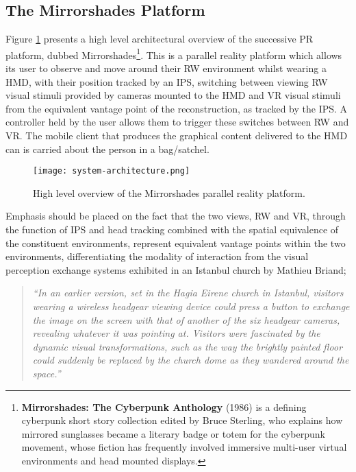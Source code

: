 \subsection{The Mirrorshades Platform}

Figure \ref{systemarchitecture} presents a high level architectural overview of the successive PR platform, dubbed Mirrorshades\footnote{\textbf{Mirrorshades: The Cyberpunk Anthology} (1986) is a defining cyberpunk short story collection edited by Bruce Sterling, who explains how mirrored sunglasses became a literary badge or totem for the cyberpunk movement, whose fiction has frequently involved immersive multi-user virtual environments and head mounted displays.}. This is a parallel reality platform which allows its user to observe and move around their RW environment whilst wearing a HMD, with their position tracked by an IPS, switching between viewing RW visual stimuli provided by cameras mounted to the HMD and VR visual stimuli from the equivalent vantage point of the reconstruction, as tracked by the IPS. A controller held by the user allows them to trigger these switches between RW and VR. The mobile client that produces the graphical content delivered to the HMD can is carried about the person in a bag/satchel.

\begin{figure}[h]
	\begin{center}
		\texttt{[image: system-architecture.png]}
		\caption{High level overview of the Mirrorshades parallel reality platform.}
		\label{systemarchitecture}
	\end{center}
\end{figure}

Emphasis should be placed on the fact that the two views, RW and VR, through the function of IPS and head tracking combined with the spatial equivalence of the constituent environments, represent equivalent vantage points within the two environments, differentiating the modality of interaction from the visual perception exchange systems exhibited in an Istanbul church by Mathieu Briand;

\begin{quote}
	\textit{``In an earlier version, set in the Hagia Eirene church in Istanbul, visitors wearing a wireless headgear viewing device could press a button to exchange the image on the screen with that of another of the six headgear cameras, revealing whatever it was pointing at. Visitors were fascinated by the dynamic visual transformations, such as the way the brightly painted floor could suddenly be replaced by the church dome as they wandered around the space.''}~\cite{Jones2006}
\end{quote}

